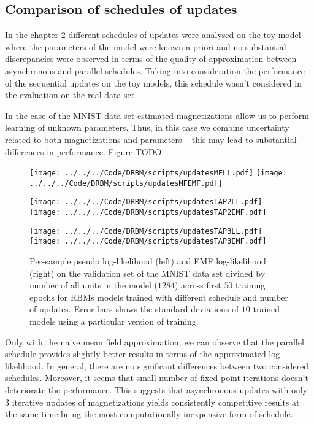 \documentclass[../report/report.tex]{subfiles}
\begin{document}
\subsection{Comparison of schedules of updates}
In the chapter $2$ different schedules of updates were analysed on the toy model where the parameters of the model were known a priori and no substantial discrepancies were observed in terms of the quality of approximation between asynchronous and parallel schedules. Taking into consideration the performance of the sequential updates on the toy models, this schedule wasn't considered in the evaluation on the real data set.

In the case of the MNIST data set estimated magnetizations allow us to perform learning of unknown parameters. Thus, in this case we combine uncertainty related to both magnetizations and parameters -- this may lead to substantial differences in performance. Figure 
TODO

\begin{figure}[!htb]
%
 \texttt{[image: ../../../Code/DRBM/scripts/updatesMFLL.pdf]}
\endminipage 
{}  
 \texttt{[image: ../../../Code/DRBM/scripts/updatesMFEMF.pdf]}
\endminipage\hfill

%
 \texttt{[image: ../../../Code/DRBM/scripts/updatesTAP2LL.pdf]}
\endminipage 
{}  
 \texttt{[image: ../../../Code/DRBM/scripts/updatesTAP2EMF.pdf]}
\endminipage\hfill

%
 \texttt{[image: ../../../Code/DRBM/scripts/updatesTAP3LL.pdf]}
\endminipage 
{}  
 \texttt{[image: ../../../Code/DRBM/scripts/updatesTAP3EMF.pdf]}
\endminipage\hfill
  \caption[1]{Per-sample pseudo log-likelihood (left) and EMF log-likelihood (right) on the validation set of the MNIST data set divided by number of all units in the model ($1284$) across first $50$ training epochs for RBMs models trained with different schedule and number of updates. Error bars shows the standard deviations of $10$ trained models using a particular version of training.}
  \label{fig:updatesLL}
\end{figure}

Only with the naive mean field approximation, we can observe that the parallel schedule provides slightly better results in terms of the approximated log-likelihood. In general, there are no significant differences between two considered schedules. Moreover, it seems that small number of fixed point iterations doesn't deteriorate the performance. This suggests that asynchronous updates with only $3$ iterative updates of magnetizations yields consistently competitive results at the same time being the most computationally inexpensive form of schedule.
\end{document}
